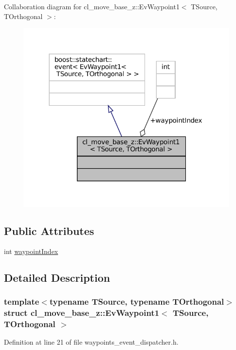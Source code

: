 Collaboration diagram for cl\+\_\+move\+\_\+base\+\_\+z\+:\+:Ev\+Waypoint1$<$ T\+Source, T\+Orthogonal $>$\+:
\nopagebreak
\begin{figure}[H]
\begin{center}
\leavevmode
\includegraphics[width=317pt]{structcl__move__base__z_1_1EvWaypoint1__coll__graph}
\end{center}
\end{figure}
\subsection*{Public Attributes}
\begin{DoxyCompactItemize}
\item 
int \hyperlink{structcl__move__base__z_1_1EvWaypoint1_ae8f88413aec5661bbccfbaa64411f425}{waypoint\+Index}
\end{DoxyCompactItemize}


\subsection{Detailed Description}
\subsubsection*{template$<$typename T\+Source, typename T\+Orthogonal$>$\newline
struct cl\+\_\+move\+\_\+base\+\_\+z\+::\+Ev\+Waypoint1$<$ T\+Source, T\+Orthogonal $>$}



Definition at line 21 of file waypoints\+\_\+event\+\_\+dispatcher.\+h.



